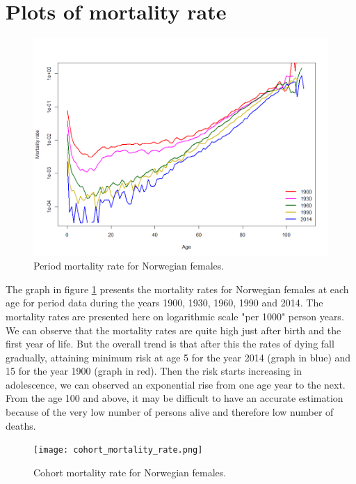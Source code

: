  







\section{Plots of mortality rate}

         \begin{figure}[tbh]
             \centering
              \includegraphics[width=0.8\linewidth]{figures/period_mortality_rate.png}
              \caption{Period mortality rate for Norwegian females.}
              \label{fig:period plot}
         \end{figure}



         
The graph in figure \ref{fig:period plot} presents the mortality rates for Norwegian females at each age for period data during the years 1900, 1930, 1960, 1990 and 2014.
The mortality rates are presented here on logarithmic scale "per 1000" person years. 
We can observe that the mortality rates are quite high just after birth and the first year of life. 
But the overall trend is that after this the rates of dying fall gradually, attaining minimum risk at age 5 for the year 2014 (graph in blue) and 15 for the year 1900 (graph in red). 
Then the risk starts increasing in adolescence, we can observed an exponential rise from one age year to the next.
From the age 100 and above, it may be difficult to have an accurate estimation because of the very low number of persons alive and therefore low number of deaths.

            \begin{figure}[tbh]
             \centering
              \texttt{[image: cohort\_mortality\_rate.png]}
              \caption{Cohort mortality rate for Norwegian females.}
              \label{fig:cohort plot}
            \end{figure}

